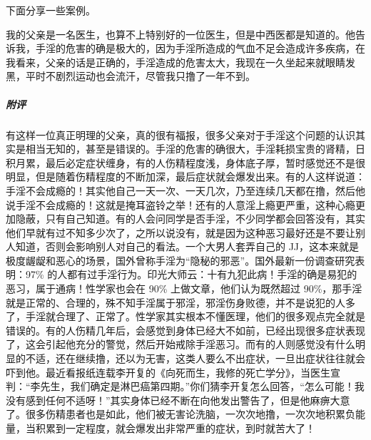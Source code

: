 下面分享一些案例。

\begin{case}
    我的父亲是一名医生，也算不上特别好的一位医生，但是中西医都是知道的。他告诉我，手淫的危害的确是极大的，因为手淫所造成的气血不足会造成许多疾病，在我看来，父亲的话是正确的，手淫造成的危害太大，我现在一久坐起来就眼睛发黑，平时不剧烈运动也会流汗，尽管我只撸了一年不到。
    \subparagraph{附评} 有这样一位真正明理的父亲，真的很有福报，很多父亲对于手淫这个问题的认识其实是相当无知的，甚至是错误的。手淫的危害的确很大，手淫耗损宝贵的肾精，日积月累，最后必定症状缠身，有的人伤精程度浅，身体底子厚，暂时感觉还不是很明显，但是随着伤精程度的不断加深，最后症状就会爆发出来。有的人这样说道：手淫不会成瘾的！其实他自己一天一次、一天几次，乃至连续几天都在撸，然后他说手淫不会成瘾的！这就是掩耳盗铃之举！还有的人意淫上瘾更严重，这种心瘾更加隐蔽，只有自己知道。有的人会问同学是否手淫，不少同学都会回答没有，其实他们早就有过不知多少次了，之所以说没有，就是因为这种恶习最好还是不要让别人知道，否则会影响别人对自己的看法。一个大男人套弄自己的 JJ，这本来就是极度龌龊和恶心的场景，国外曾称手淫为“隐秘的邪恶”。国外最新一份调查研究表明：97\% 的人都有过手淫行为。印光大师云：十有九犯此病！手淫的确是易犯的恶习，属于通病！性学家也会在 90\% 上做文章，他们认为既然超过 90\%，那手淫就是正常的、合理的，殊不知手淫属于邪淫，邪淫伤身败德，并不是说犯的人多了，手淫就合理了、正常了。性学家其实根本不懂医理，他们的很多观点完全就是错误的。有的人伤精几年后，会感觉到身体已经大不如前，已经出现很多症状表现了，这会引起他充分的警觉，然后开始戒除手淫恶习。而有的人则感觉没有什么明显的不适，还在继续撸，还以为无害，这类人要么不出症状，一旦出症状往往就会吓到他。最近看报纸连载李开复的《向死而生，我修的死亡学分》，当医生宣判：“李先生，我们确定是淋巴癌第四期。”你们猜李开复怎么回答，“怎么可能！我没有感到任何不适呀！”其实身体已经不断在向他发出警告了，但是他麻痹大意了。很多伤精患者也是如此，他们被无害论洗脑，一次次地撸，一次次地积累负能量，当积累到一定程度，就会爆发出非常严重的症状，到时就苦大了！
\end{case}

